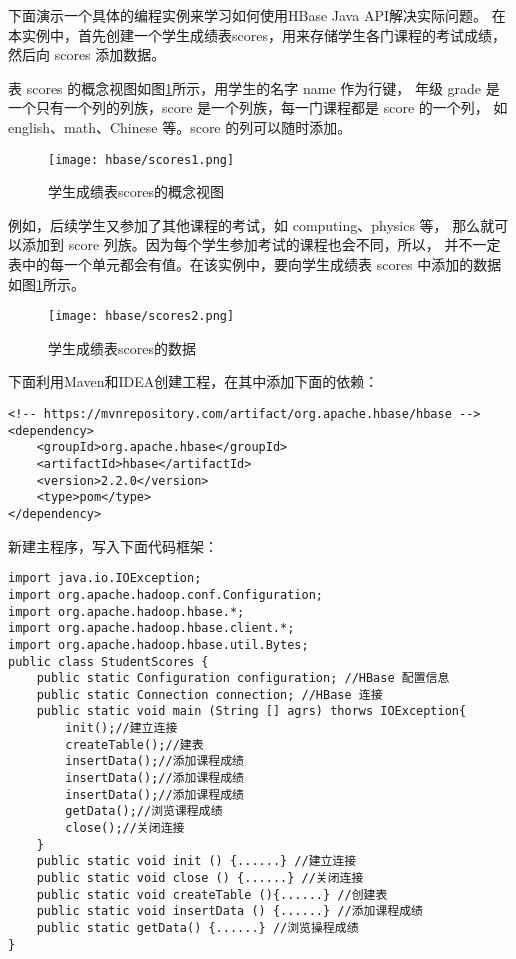 下面演示一个具体的编程实例来学习如何使用HBase Java API解决实际问题。
在本实例中，首先创建一个学生成绩表scores，用来存储学生各门课程的考试成绩，然后向 scores 添加数据。

表 scores 的概念视图如图\ref{fig:scores1}所示，用学生的名字 name 作为行键，
年级 grade 是一个只有一个列的列族，score 是一个列族，每一门课程都是 score 的一个列，
如 english、math、Chinese 等。score 的列可以随时添加。

\begin{figure}[h]
	\centering
	\texttt{[image: hbase/scores1.png]}
	\caption{学生成缋表scores的概念视图}
	\label{fig:scores1}
\end{figure}

例如，后续学生又参加了其他课程的考试，如 computing、physics 等，
那么就可以添加到 score 列族。因为每个学生参加考试的课程也会不同，所以，
并不一定表中的每一个单元都会有值。在该实例中，要向学生成绩表 scores 中添加的数据如图\ref{fig:scores1}所示。

\begin{figure}[h]
	\centering
	\texttt{[image: hbase/scores2.png]}
	\caption{学生成缋表scores的数据}
	\label{fig:scores2}
\end{figure}

下面利用Maven和IDEA创建工程，在其中添加下面的依赖：

\begin{lstlisting}[style=myxml,title=添加Hbase Maven依赖]
<!-- https://mvnrepository.com/artifact/org.apache.hbase/hbase -->
<dependency>
	<groupId>org.apache.hbase</groupId>
	<artifactId>hbase</artifactId>
	<version>2.2.0</version>
	<type>pom</type>
</dependency>	
\end{lstlisting}

新建主程序，写入下面代码框架：

\begin{lstlisting}[style=customjava,title=主程序框架]
import java.io.IOException;
import org.apache.hadoop.conf.Configuration;
import org.apache.hadoop.hbase.*;
import org.apache.hadoop.hbase.client.*;
import org.apache.hadoop.hbase.util.Bytes;
public class StudentScores {
	public static Configuration configuration; //HBase 配置信息
	public static Connection connection; //HBase 连接
	public static void main (String [] agrs) thorws IOException{
		init();//建立连接
		createTable();//建表
		insertData();//添加课程成绩
		insertData();//添加课程成绩
		insertData();//添加课程成绩
		getData();//浏览课程成绩
		close();//关闭连接
	}
	public static void init () {......} //建立连接
	public static void close () {......} //关闭连接
	public static void createTable (){......} //创建表
	public static void insertData () {......} //添加课程成绩
	public static getData() {......} //浏览操程成绩
}
\end{lstlisting}

